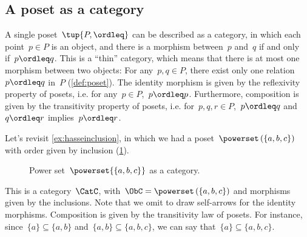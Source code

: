 
\subsection{A poset as a category}
\label{sec:posetsarecats}
A single poset~$\tup{P, \ordleq}$ can be described as a category, in which each point~$p\in P$ is an object, and there is a morphism between~$p$ and~$q$ if and only if~$p \ordleq q$. This is a ``thin'' category, which means that there is at most one morphism
between two objects: For any~$p,q\in P$, there exist only one relation~$p\ordleq q$ in~$P$ (\cref{def:poset}). The identity morphism is given by the reflexivity property of posets, i.e. for any~$p\in P$,~$p\ordleq p$. Furthermore, composition is given by the transitivity property of posets, i.e. for~$p,q,r \in P$,~$p\ordleq q$ and~$q\ordleq r$ implies~$p\ordleq r$.

\begin{example}
Let's revisit \cref{ex:hasseinclusion}, in which we had a poset~$\powerset\left(\{a,b,c\}\right)$ with order given by inclusion (\cref{fig:posetascat}).
\begin{figure}[h!]
\begin{center}
\end{center}
\caption{Power set~$\powerset{\{a,b,c\}}$ as a category. \label{fig:posetascat}}
\end{figure}
This is a category~$\CatC$, with~$\ObC=\powerset\left(\{a,b,c\}\right)$ and morphisms given by the inclusions. Note that we omit to draw self-arrows for the identity morphisms. Composition is given by the transitivity law of posets. For instance, since~$\{a\}\subseteq \{a,b\}$ and~$\{a,b\} \subseteq \{a,b,c\}$, we can say that~$\{a\}\subseteq \{a,b,c\}$.
\end{example}


